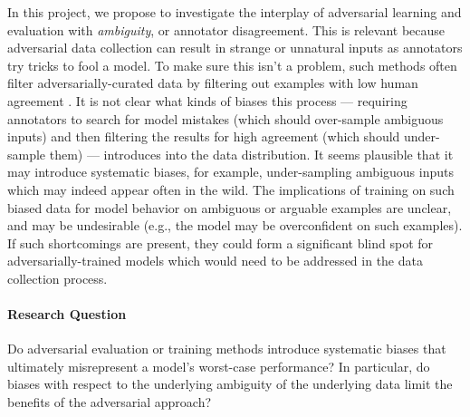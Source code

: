 \documentclass[10pt,a4paper]{article}
\newcommand{\eg}{e.g.}
\begin{document}
In this project, we propose to investigate the interplay of adversarial learning and evaluation with
\textit{ambiguity}, or annotator disagreement.
This is relevant because adversarial data collection can result in strange or unnatural inputs as annotators try tricks to fool a model. To make sure this isn't a problem, such methods often filter adversarially-curated data by filtering out examples with low human agreement \citep{nie-etal-2020-adversarial}.
It is not clear what kinds of biases this process ---
requiring annotators to search for model mistakes (which should over-sample ambiguous inputs) and then filtering the results for high agreement (which should under-sample them) --- introduces into the data distribution.
It seems plausible that it may introduce systematic biases, for example, under-sampling ambiguous inputs which may indeed appear often in the wild.
The implications of training on such biased data for model behavior on ambiguous or arguable examples are unclear, and may be undesirable (\eg, the model may be overconfident on such examples).
If such shortcomings are present, they could form a significant blind spot for adversarially-trained models which would need to be addressed in the data collection process.

\paragraph{Research Question}
Do adversarial evaluation or training methods introduce systematic biases that ultimately
misrepresent a model's worst-case performance? In particular, do biases with respect to the
underlying ambiguity of the underlying data limit the benefits of the adversarial approach?
\end{document}

